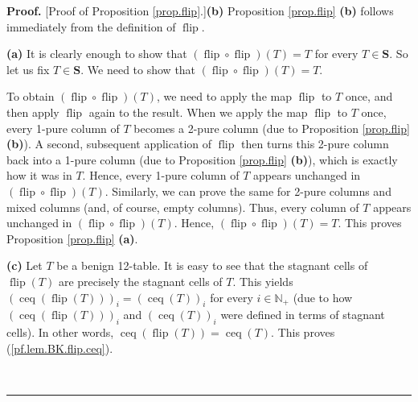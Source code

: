 \documentclass[numbers=enddot,12pt,final,onecolumn,notitlepage]{scrartcl}%
\theoremstyle{definition}
\newenvironment{proof}[1][Proof]{\noindent\textbf{#1.} }{\ \rule{0.5em}{0.5em}}
\begin{document}
\begin{proof}
[Proof of Proposition \ref{prop.flip}.]\textbf{(b)} Proposition
\ref{prop.flip} \textbf{(b)} follows immediately from the definition of
$\operatorname*{flip}$.

\textbf{(a)} It is clearly enough to show that $\left(  \operatorname*{flip}%
\circ\operatorname*{flip}\right)  \left(  T\right)  =T$ for every
$T\in\mathbf{S}$. So let us fix $T\in\mathbf{S}$. We need to show that
$\left(  \operatorname*{flip}\circ\operatorname*{flip}\right)  \left(
T\right)  =T$.

To obtain $\left(  \operatorname*{flip}\circ\operatorname*{flip}\right)
\left(  T\right)  $, we need to apply the map $\operatorname*{flip}$ to $T$
once, and then apply $\operatorname*{flip}$ again to the result. When we apply
the map $\operatorname*{flip}$ to $T$ once, every 1-pure column of $T$ becomes
a 2-pure column (due to Proposition \ref{prop.flip} \textbf{(b)}). A second,
subsequent application of $\operatorname*{flip}$ then turns this 2-pure column
back into a 1-pure column (due to Proposition \ref{prop.flip} \textbf{(b)}),
which is exactly how it was in $T$. Hence, every 1-pure column of $T$ appears
unchanged in $\left(  \operatorname*{flip}\circ\operatorname*{flip}\right)
\left(  T\right)  $. Similarly, we can prove the same for 2-pure columns and
mixed columns (and, of course, empty columns). Thus, every column of $T$
appears unchanged in $\left(  \operatorname*{flip}\circ\operatorname*{flip}%
\right)  \left(  T\right)  $. Hence, $\left(  \operatorname*{flip}%
\circ\operatorname*{flip}\right)  \left(  T\right)  =T$. This proves
Proposition \ref{prop.flip} \textbf{(a)}.

\textbf{(c)} Let $T$ be a benign 12-table. It is easy to see that the stagnant
cells of $\operatorname*{flip}\left(  T\right)  $ are precisely the stagnant
cells of $T$. This yields $\left(  \operatorname*{ceq}\left(
\operatorname*{flip}\left(  T\right)  \right)  \right)  _{i}=\left(
\operatorname*{ceq}\left(  T\right)  \right)  _{i}$ for every $i\in
\mathbb{N}_{+}$ (due to how $\left(  \operatorname*{ceq}\left(
\operatorname*{flip}\left(  T\right)  \right)  \right)  _{i}$ and $\left(
\operatorname*{ceq}\left(  T\right)  \right)  _{i}$ were defined in terms of
stagnant cells). In other words, $\operatorname*{ceq}\left(
\operatorname*{flip}\left(  T\right)  \right)  =\operatorname*{ceq}\left(
T\right)  $. This proves (\ref{pf.lem.BK.flip.ceq}).


\end{proof}
\end{document}
